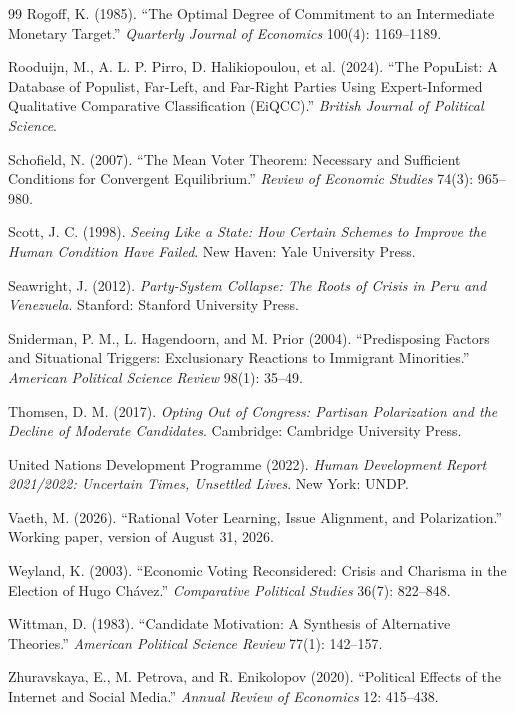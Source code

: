 \documentclass[12pt,letterpaper]{article}
\begin{document}
\begin{thebibliography}{99}
Rogoff, K. (1985). ``The Optimal Degree of Commitment to an Intermediate Monetary Target.'' \textit{Quarterly Journal of Economics} 100(4): 1169--1189.

Rooduijn, M., A. L. P. Pirro, D. Halikiopoulou, et al. (2024). ``The PopuList: A Database of Populist, Far-Left, and Far-Right Parties Using Expert-Informed Qualitative Comparative Classification (EiQCC).'' \textit{British Journal of Political Science}.

Schofield, N. (2007). ``The Mean Voter Theorem: Necessary and Sufficient Conditions for Convergent Equilibrium.'' \textit{Review of Economic Studies} 74(3): 965--980.

Scott, J. C. (1998). \textit{Seeing Like a State: How Certain Schemes to Improve the Human Condition Have Failed}. New Haven: Yale University Press.

Seawright, J. (2012). \textit{Party-System Collapse: The Roots of Crisis in Peru and Venezuela}. Stanford: Stanford University Press.

Sniderman, P. M., L. Hagendoorn, and M. Prior (2004). ``Predisposing Factors and Situational Triggers: Exclusionary Reactions to Immigrant Minorities.'' \textit{American Political Science Review} 98(1): 35--49.

Thomsen, D. M. (2017). \textit{Opting Out of Congress: Partisan Polarization and the Decline of Moderate Candidates}. Cambridge: Cambridge University Press.

United Nations Development Programme (2022). \textit{Human Development Report 2021/2022: Uncertain Times, Unsettled Lives}. New York: UNDP.

Vaeth, M. (2026). ``Rational Voter Learning, Issue Alignment, and Polarization.'' Working paper, version of August 31, 2026.

Weyland, K. (2003). ``Economic Voting Reconsidered: Crisis and Charisma in the Election of Hugo Ch\'{a}vez.'' \textit{Comparative Political Studies} 36(7): 822--848.

Wittman, D. (1983). ``Candidate Motivation: A Synthesis of Alternative Theories.'' \textit{American Political Science Review} 77(1): 142--157.

Zhuravskaya, E., M. Petrova, and R. Enikolopov (2020). ``Political Effects of the Internet and Social Media.'' \textit{Annual Review of Economics} 12: 415--438.

\end{thebibliography}
\end{document}

